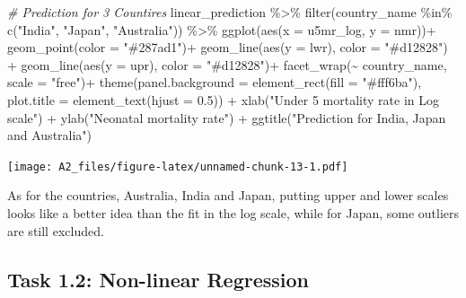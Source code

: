 \documentclass[
]{article}
\newenvironment{Shaded}{\begin{snugshade}}{\end{snugshade}}
\newcommand{\AttributeTok}[1]{\textcolor[rgb]{0.77,0.63,0.00}{#1}}
\newcommand{\CommentTok}[1]{\textcolor[rgb]{0.56,0.35,0.01}{\textit{#1}}}
\newcommand{\FloatTok}[1]{\textcolor[rgb]{0.00,0.00,0.81}{#1}}
\newcommand{\FunctionTok}[1]{\textcolor[rgb]{0.00,0.00,0.00}{#1}}
\newcommand{\NormalTok}[1]{#1}
\newcommand{\SpecialCharTok}[1]{\textcolor[rgb]{0.00,0.00,0.00}{#1}}
\newcommand{\StringTok}[1]{\textcolor[rgb]{0.31,0.60,0.02}{#1}}
\begin{document}
\begin{Shaded}
\begin{Highlighting}[]
\CommentTok{\#  Prediction for 3 Countires}
\NormalTok{ linear\_prediction }\SpecialCharTok{\%\textgreater{}\%}
  \FunctionTok{filter}\NormalTok{(country\_name }\SpecialCharTok{\%in\%} \FunctionTok{c}\NormalTok{(}\StringTok{"India"}\NormalTok{, }\StringTok{"Japan"}\NormalTok{, }\StringTok{"Australia"}\NormalTok{)) }\SpecialCharTok{\%\textgreater{}\%} 
  \FunctionTok{ggplot}\NormalTok{(}\FunctionTok{aes}\NormalTok{(}\AttributeTok{x =}\NormalTok{ u5mr\_log, }\AttributeTok{y =}\NormalTok{ nmr))}\SpecialCharTok{+}
  \FunctionTok{geom\_point}\NormalTok{(}\AttributeTok{color =} \StringTok{"\#287ad1"}\NormalTok{)}\SpecialCharTok{+}
  \FunctionTok{geom\_line}\NormalTok{(}\FunctionTok{aes}\NormalTok{(}\AttributeTok{y =}\NormalTok{ lwr), }\AttributeTok{color =} \StringTok{"\#d12828"}\NormalTok{) }\SpecialCharTok{+}
  \FunctionTok{geom\_line}\NormalTok{(}\FunctionTok{aes}\NormalTok{(}\AttributeTok{y =}\NormalTok{ upr), }\AttributeTok{color =} \StringTok{"\#d12828"}\NormalTok{)}\SpecialCharTok{+}
  \FunctionTok{facet\_wrap}\NormalTok{(}\SpecialCharTok{\textasciitilde{}}\NormalTok{ country\_name, }\AttributeTok{scale =} \StringTok{"free"}\NormalTok{)}\SpecialCharTok{+}
  \FunctionTok{theme}\NormalTok{(}\AttributeTok{panel.background =} \FunctionTok{element\_rect}\NormalTok{(}\AttributeTok{fill =} \StringTok{"\#fff6ba"}\NormalTok{),}
        \AttributeTok{plot.title =} \FunctionTok{element\_text}\NormalTok{(}\AttributeTok{hjust =} \FloatTok{0.5}\NormalTok{)) }\SpecialCharTok{+}
  \FunctionTok{xlab}\NormalTok{(}\StringTok{"Under 5 mortality rate in Log scale"}\NormalTok{) }\SpecialCharTok{+}
  \FunctionTok{ylab}\NormalTok{(}\StringTok{"Neonatal mortality rate"}\NormalTok{) }\SpecialCharTok{+}
  \FunctionTok{ggtitle}\NormalTok{(}\StringTok{"Prediction for India, Japan and Australia"}\NormalTok{)}
\end{Highlighting}
\end{Shaded}

\texttt{[image: A2\_files/figure-latex/unnamed-chunk-13-1.pdf]}

As for the countries, Australia, India and Japan, putting upper and
lower scales looks like a better idea than the fit in the log scale,
while for Japan, some outliers are still excluded.

\hypertarget{task-1.2-non-linear-regression}{%
\subsection{Task 1.2: Non-linear
Regression}\label{task-1.2-non-linear-regression}}
\end{document}
